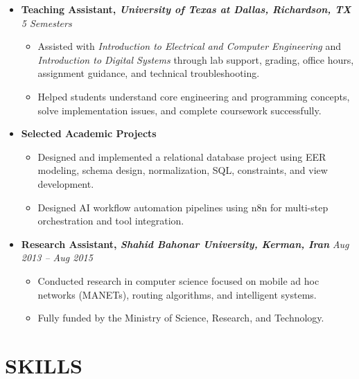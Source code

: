 \documentclass[10pt,a4paper,sans]{moderncv}
\begin{document}
\begin{itemize}[leftmargin=0.0 cm, label={}]
    \item \textbf{Teaching Assistant, \textit{University of Texas at Dallas, Richardson, TX}} \hfill \textit{5 Semesters}
    \begin{itemize}[leftmargin=0.6cm, label={\textbullet}]
        \item Assisted with \textit{Introduction to Electrical and Computer Engineering} and \textit{Introduction to Digital Systems} through lab support, grading, office hours, assignment guidance, and technical troubleshooting.
        \item Helped students understand core engineering and programming concepts, solve implementation issues, and complete coursework successfully.
    \end{itemize}

    \item \textbf{Selected Academic Projects}
    \begin{itemize}[leftmargin=0.6cm, label={\textbullet}]
        \item Designed and implemented a relational database project using EER modeling, schema design, normalization, SQL, constraints, and view development.
        \item Designed AI workflow automation pipelines using n8n for multi-step orchestration and tool integration.
    \end{itemize}
    
    \item \textbf{Research Assistant, \textit{Shahid Bahonar University, Kerman, Iran}} \hfill \textit{Aug 2013 -- Aug 2015}
    \begin{itemize}[leftmargin=0.6cm, label={\textbullet}]
        \item Conducted research in computer science focused on mobile ad hoc networks (MANETs), routing algorithms, and intelligent systems.
        \item Fully funded by the Ministry of Science, Research, and Technology.
    \end{itemize}
\end{itemize}

\vspace*{-3mm}


\section{SKILLS}
\end{document}
